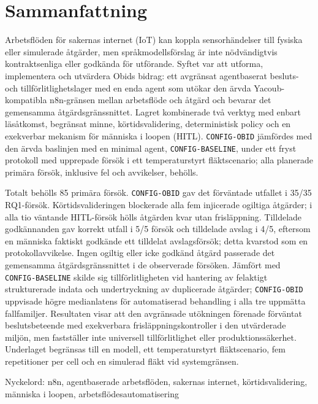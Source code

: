 \section*{Sammanfattning}\label{sec:sammanfattning}

\setlength{\emergencystretch}{2em}

Arbetsflöden för sakernas internet (IoT) kan koppla sensorhändelser till fysiska
eller simulerade åtgärder, men språkmodellsförslag är inte nödvändigtvis
kontraktsenliga eller godkända för utförande. Syftet var att utforma,
implementera och utvärdera Obids bidrag: ett avgränsat agentbaserat besluts- och
tillförlitlighetslager med en enda agent som utökar den ärvda
Yacoub-kompatibla n8n-gränsen mellan arbetsflöde och åtgärd och bevarar det
gemensamma åtgärdsgränssnittet. Lagret kombinerade två verktyg med enbart
läsåtkomst, begränsat minne, körtidsvalidering, deterministisk policy och en
exekverbar mekanism för människa i loopen (HITL). \texttt{CONFIG-OBID}
jämfördes med den ärvda baslinjen med en minimal agent,
\texttt{CONFIG-BASELINE}, under ett fryst protokoll med upprepade försök i ett
temperaturstyrt fläktscenario; alla planerade primära försök, inklusive fel och
avvikelser, behölls.

Totalt behölls 85 primära försök. \texttt{CONFIG-OBID} gav det förväntade
utfallet i 35/35 RQ1-försök. Körtidsvalideringen blockerade alla fem injicerade
ogiltiga åtgärder; i alla tio väntande HITL-försök hölls åtgärden kvar utan
frisläppning. Tilldelade godkännanden gav korrekt utfall i 5/5 försök och
tilldelade avslag i 4/5, eftersom en människa faktiskt godkände ett tilldelat
avslagsförsök; detta kvarstod som en protokollavvikelse. Ingen ogiltig eller
icke godkänd åtgärd passerade det gemensamma åtgärdsgränssnittet i de
observerade försöken. Jämfört med \texttt{CONFIG-BASELINE} skilde sig
tillförlitligheten vid hantering av felaktigt strukturerade indata och
undertryckning av duplicerade åtgärder; \texttt{CONFIG-OBID} uppvisade högre
medianlatens för automatiserad behandling i alla tre uppmätta fallfamiljer.
Resultaten visar att den avgränsade utökningen förenade förväntat
beslutsbeteende med exekverbara frisläppningskontroller i den utvärderade
miljön, men fastställer inte universell tillförlitlighet eller
produktionssäkerhet. Underlaget begränsas till en modell, ett temperaturstyrt
fläktscenario, fem repetitioner per cell och en simulerad fläkt vid
systemgränsen.

Nyckelord: n8n, agentbaserade arbetsflöden, sakernas internet,
körtidsvalidering, människa i loopen, arbetsflödesautomatisering

\setlength{\emergencystretch}{0pt}

